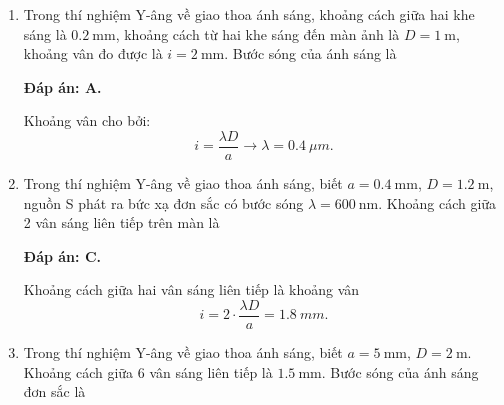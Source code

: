 \begin{enumerate}[label=\bfseries Câu \arabic*:]
	\item {} 
	
	\cauhoi
	{Trong thí nghiệm Y-âng về giao thoa ánh sáng, khoảng cách giữa hai khe sáng là $\SI{0.2}{\milli \meter}$, khoảng cách từ hai khe sáng đến màn ảnh là $D=\SI{1}{\meter}$, khoảng vân đo được là $i=\SI{2}{\milli \meter}$. Bước sóng của ánh sáng là
	}
	
	\loigiai
	{		\textbf{Đáp án: A.}
		
Khoảng vân cho bởi:
$$
	i = \dfrac{\lambda D}{a} \rightarrow \lambda = \SI{0,4}{\mu m}.
$$	
	}
	
	\item {}
	
	\cauhoi
	{Trong thí nghiệm Y-âng về giao thoa ánh sáng, biết $a=\SI{0.4}{\milli \meter}$, $D=\SI{1.2}{\meter}$, nguồn S phát ra bức xạ đơn sắc có bước sóng $\lambda = \SI{600}{\nano \meter}$. Khoảng cách giữa 2 vân sáng liên tiếp trên màn là
	}
	
	\loigiai
	{		\textbf{Đáp án: C.}
		
Khoảng cách giữa hai vân sáng liên tiếp là khoảng vân
$$
	i = 2 \cdot \dfrac{\lambda D}{a} = \SI{1,8}{mm}.
$$
		
	}
	
\item {} 
	
	\cauhoi
	{Trong thí nghiệm Y-âng về giao thoa ánh sáng, biết $a=\SI{5}{\milli \meter}$, $D=\SI{2}{\meter}$. Khoảng cách giữa 6 vân sáng liên tiếp là $\SI{1.5}{\milli \meter}$. Bước sóng của ánh sáng đơn sắc là
	}
	

\end{enumerate}
